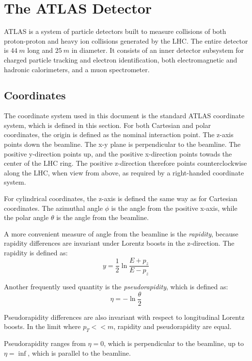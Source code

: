 \chapter{The ATLAS Detector}

ATLAS is a system of particle detectors built to
measure collisions of both proton-proton and heavy ion collisions
generated by the LHC. \cite{atlas-detector-2008} The entire detector
is $44~m$ long and $25~m$ in diameter. It consists of an inner
detector subsystem for charged particle tracking and electron
identification, both electromagnetic and hadronic calorimeters, and a
muon spectrometer.

\section{Coordinates}
The coordinate system used in this document is the standard ATLAS
coordinate system, which is defined in this section. For both Cartesian and
polar coordinates, the origin is defined as the nominal interaction
point. The z-axis points down the beamline. The x-y plane is
perpendicular to the beamline. The positive y-direction points up, and
the positive x-direction points towads the center of the LHC ring. The
positive z-direction therefore points counterclockwise along the LHC,
when view from above, as required by a right-handed coordinate system.

For cylindrical coordinates, the z-axis is defined the same way as for
Cartesian coordinates. The azimuthal angle $\phi$ is the angle
from the positive x-axis, while the polar angle $\theta$ is the angle
from the beamline.

A more convenient measure of angle from the beamline is the
\textit{rapidity}, because rapidity differences are invariant under Lorentz boosts in the
z-direction. The rapidity is defined as:
\begin{equation}
y = \frac{1}{2}\ln\frac{E+p_z}{E-p_z}
\end{equation}

Another frequently used quantity is the
\textit{pseudorapidity}, which is defined as:
\begin{equation}
\eta = -\ln\frac{\theta}{2}
\end{equation}

Pseudorapidity differences are also invariant with respect to
longitudinal Lorentz boosts. In the limit where $p_T << m$, rapidity and
pseudorapidity are equal.

Pseudorapidity ranges from $\eta=0$, which is perpendicular to the
beamline, up to $\eta=\inf$, which is parallel to the beamline.


